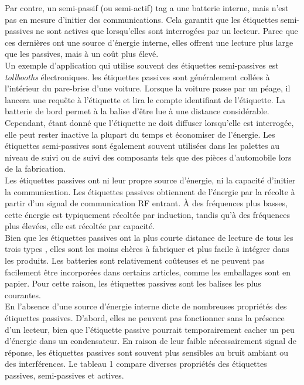 \documentclass[11pt, a4paper, twoside]{book}
\begin{document}
Par contre, un semi-passif (ou semi-actif) tag a une batterie interne, mais n'est pas en mesure d'initier des communications. Cela garantit que les étiquettes semi-passives ne sont actives que lorsqu'elles sont interrogées par un lecteur. Parce que ces dernières ont une source d'énergie interne, elles offrent une lecture plus large que les passives, mais à un coût plus élevé.\\


Un exemple d'application qui utilise souvent des étiquettes semi-passives est \emph {tollbooths} électroniques. les étiquettes passives sont généralement collées à l'intérieur du pare-brise d'une voiture. Lorsque la voiture passe par un péage, il lancera une requête à l'étiquette et lira le compte identifiant de l'étiquette. La batterie de bord permet à la balise d'être lue à une distance considérable. Cependant, étant donné que l'étiquette ne doit diffuser lorsqu'elle est interrogée, elle peut rester inactive la plupart du temps et économiser de l'énergie. Les étiquettes semi-passives sont également souvent utilisées dans les palettes au niveau de suivi ou de suivi des composants tels que des pièces d'automobile lors de la fabrication.\\


Les étiquettes passives ont ni leur propre source d'énergie, ni la capacité d'initier la communication. Les étiquettes passives obtiennent de l'énergie par la récolte à partir d'un signal de communication RF entrant. À des fréquences plus basses, cette énergie est typiquement récoltée par induction, tandis qu'à des fréquences plus élevées, elle est récoltée par capacité.\\

Bien que les étiquettes passives ont la plus courte distance de lecture de tous les trois types , elles sont les moins chères à fabriquer et plus facile à intégrer dans les produits. Les batteries sont relativement coûteuses et ne peuvent pas facilement être incorporées dans certains articles, comme les emballages sont en papier. Pour cette raison, les étiquettes passives sont les balises les plus courantes.\\

En l'absence d'une source d'énergie interne dicte de nombreuses propriétés des étiquettes passives. D'abord, elles ne peuvent pas fonctionner sans la présence d'un lecteur, bien que l'étiquette passive pourrait temporairement cacher un peu d'énergie dans un condensateur. En raison de leur faible nécessairement signal de réponse, les étiquettes passives sont souvent plus sensibles au bruit ambiant ou des interférences. Le tableau 1 compare diverses propriétés des étiquettes passives, semi-passives et actives.\\
\end{document}
